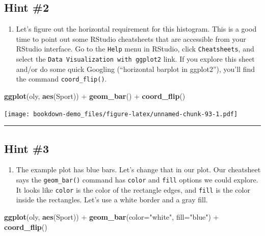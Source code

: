 \documentclass[]{book}
\newenvironment{Shaded}{\begin{snugshade}}{\end{snugshade}}
\newcommand{\KeywordTok}[1]{\textcolor[rgb]{0.13,0.29,0.53}{\textbf{{#1}}}}
\newcommand{\DataTypeTok}[1]{\textcolor[rgb]{0.13,0.29,0.53}{{#1}}}
\newcommand{\StringTok}[1]{\textcolor[rgb]{0.31,0.60,0.02}{{#1}}}
\newcommand{\NormalTok}[1]{{#1}}
\providecommand{\tightlist}{%
  \setlength{\itemsep}{0pt}\setlength{\parskip}{0pt}}
\begin{document}
\subsection{Hint \#2}\label{hint-2}

\begin{enumerate}
\def\labelenumi{\arabic{enumi})}
\setcounter{enumi}{1}
\tightlist
\item
  Let's figure out the horizontal requirement for this histogram. This
  is a good time to point out some RStudio cheatsheets that are
  accessible from your RStudio interface. Go to the \texttt{Help} menu
  in RStudio, click \texttt{Cheatsheets}, and select the
  \texttt{Data\ Visualization\ with\ ggplot2} link. If you explore this
  sheet and/or do some quick Googling (``horizontal barplot in
  ggplot2''), you'll find the command \texttt{coord\_flip()}.
\end{enumerate}

\begin{Shaded}
\begin{Highlighting}[]
\KeywordTok{ggplot}\NormalTok{(oly, }\KeywordTok{aes}\NormalTok{(Sport)) +}\StringTok{ }\KeywordTok{geom_bar}\NormalTok{() +}\StringTok{ }\KeywordTok{coord_flip}\NormalTok{()}
\end{Highlighting}
\end{Shaded}

\texttt{[image: bookdown-demo\_files/figure-latex/unnamed-chunk-93-1.pdf]}

\begin{center}\rule{0.5\linewidth}{\linethickness}\end{center}

\subsection{Hint \#3}\label{hint-3}

\begin{enumerate}
\def\labelenumi{\arabic{enumi})}
\setcounter{enumi}{2}
\tightlist
\item
  The example plot has blue bars. Let's change that in our plot. Our
  cheatsheet says the \texttt{geom\_bar()} command has \texttt{color}
  and \texttt{fill} options we could explore. It looks like
  \texttt{color} is the color of the rectangle edges, and \texttt{fill}
  is the color inside the rectangles. Let's use a white border and a
  gray fill.
\end{enumerate}

\begin{Shaded}
\begin{Highlighting}[]
\KeywordTok{ggplot}\NormalTok{(oly, }\KeywordTok{aes}\NormalTok{(Sport)) +}\StringTok{ }\KeywordTok{geom_bar}\NormalTok{(}\DataTypeTok{color=}\StringTok{"white"}\NormalTok{, }\DataTypeTok{fill=}\StringTok{"blue"}\NormalTok{) +}\StringTok{ }\KeywordTok{coord_flip}\NormalTok{()}
\end{Highlighting}
\end{Shaded}
\end{document}

